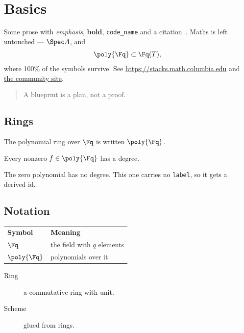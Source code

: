 \chapter{Basics}\label{chap:basics}

Some prose with \emph{emphasis}, \textbf{bold}, \texttt{code\_name} and a
citation~\cite{stacks}.  Maths is left untouched --- $\Spec A$, and
\[
  \poly{\Fq} \subset \Fq(T),
\]
where 100\% of the symbols survive.  See \url{https://stacks.math.columbia.edu}
and \href{https://leanprover-community.github.io}{the community site}.

\begin{quote}
  A blueprint is a plan, not a proof.
\end{quote}

\section{Rings}\label{sec:rings}

\begin{definition}
\label{def:poly}
\leanok
The polynomial ring over $\Fq$ is written $\poly{\Fq}$.
\end{definition}

\begin{lemma}
\label{lem:degree}
Every nonzero $f\in\poly{\Fq}$ has a degree.
\end{lemma}

\begin{lemma}
The zero polynomial has no degree.  This one carries no \texttt{label}, so it
gets a derived id.
\end{lemma}

\section{Notation}

\begin{tabular}{ll}
  \textbf{Symbol} & \textbf{Meaning} \\
  $\Fq$ & the field with $q$ elements \\
  $\poly{\Fq}$ & polynomials over it \\
\end{tabular}

\begin{description}
  \item[Ring] a commutative ring with unit.
  \item[Scheme] glued from rings.
\end{description}
